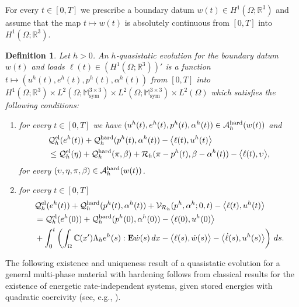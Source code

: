 \documentclass[reqno,10pt]{amsart}
\numberwithin{equation}{section}
\newtheorem{definition}[theorem]{Definition}
\theoremstyle{remark}
\newcommand{\calA}{\mathcal{A}}
\newcommand{\C}{\mathbb{C}}
\newcommand{\M}{\mathbb{M}}
\newcommand{\calQ}{\mathcal{Q}}
\newcommand{\R}{\mathbb{R}}
\newcommand{\calR}{\mathcal{R}}
\newcommand{\calV}{\mathcal{V}}
\DeclareMathOperator{\sym}{sym}
\newcommand{\E}{{\bf E}}
\begin{document}
For every $t \in [0, T]$ we prescribe a boundary datum $w(t) \in H^1(\Omega;\R^3)$ and assume that the map $t\mapsto w(t)$ is absolutely continuous from $[0, T]$ into $H^1(\Omega;\R^3)$.

\begin{definition} \label{h-quasistatic evolution}
Let $h > 0$.
An \emph{$h$-quasistatic evolution} for the boundary datum $w(t)$ and loads $\ell(t) \in (H^1(\Omega;\R^3))'$ is a function $t \mapsto (u^h(t), e^h(t), p^h(t), \alpha^h(t))$ from $[0,T]$ into $H^1(\Omega;\R^3) \times L^2(\Omega;\M^{3 \times 3}_{\sym}) \times L^2(\Omega;\M^{3 \times 3}_{\sym}) \times L^2(\Omega)$ which satisfies the following conditions:
\begin{enumerate}[label=(qs\arabic*)$_{h}$]
	\item \label{h-qs S} for every $t \in [0,T]$ we have $(u^h(t), e^h(t), p^h(t), \alpha^h(t)) \in \calA_{h}^{\rm hard}(w(t))$ and
	\begin{align*}
		& \calQ^{\rm el}_{h}(e^h(t)) + \calQ^{\rm hard}_{h}(p^h(t), \alpha^h(t)) - \big\langle \ell(t), u^h(t) \big\rangle
		\\& \leq \calQ^{\rm el}_{h}(\eta) + \calQ^{\rm hard}_{h}(\pi, \beta) + \calR_{h}(\pi - p^h(t), \beta - \alpha^h(t)) - \big\langle \ell(t), \upsilon \big\rangle,
	\end{align*}
	for every $(\upsilon, \eta, \pi, \beta) \in \calA_{h}^{\rm hard}(w(t))$.
	\item \label{h-qs E} %
	for every $t \in [0, T]$
	\begin{align*}
		& \calQ^{\rm el}_{h}(e^h(t)) + \calQ^{\rm hard}_{h}(p^h(t), \alpha^h(t)) 
		+ \calV_{\calR_{h}}(p^h, \alpha^h; 0, t) - \big\langle \ell(t), u^h(t) \big\rangle
		\\& = \calQ^{\rm el}_{h}(e^h(0)) + \calQ^{\rm hard}_{h}(p^h(0), \alpha^h(0)) - \big\langle \ell(0), u^h(0) \big\rangle 
		\\& + \int_0^t \left( \int_{\Omega} \C(x') \Lambda_h e^h(s) : {\E}\dot{w}(s) \,dx 
		- \big\langle \ell(s), \dot{w}(s) \big\rangle - \big\langle \dot{\ell}(s), u^h(s) \big\rangle \right) \,ds.
	\end{align*}
\end{enumerate}
\end{definition}

The following existence and uniqueness result of a quasistatic evolution for a general multi-phase material with hardening follows from classical results for the existence of energetic rate-independent systems, given stored energies with quadratic coercivity (see, e.g., \cite[Theorem 3.5.2]{Mielke.Roubicek.2015}).
\end{document}
